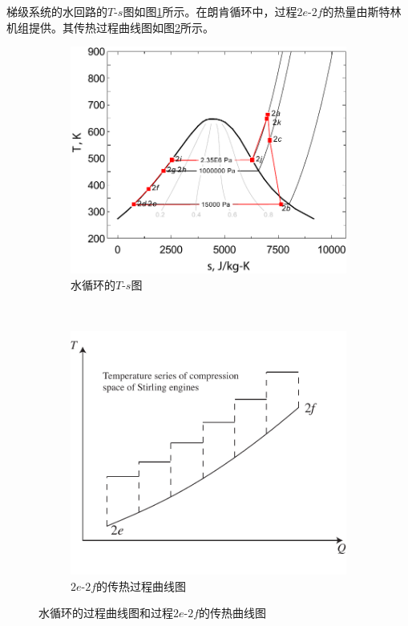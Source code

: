 梯级系统的水回路的$T$-$s$图如图\ref{fig:T-s_Water2}所示。在朗肯循环中，过程$2e$-$2f$的热量由斯特林机组提供。其传热过程曲线图如图\ref{fig:HeatTransfer_Water-SEs}所示。

\noindent \begin{figure}[htbp]
\centering
	\begin{subfigure}[b]{0.45\columnwidth}
	\includegraphics[width = \columnwidth]{fig/T-s_Water2}
	\caption{水循环的$T$-$s$图}\label{fig:T-s_Water2}
	\end{subfigure}
	~
\begin{subfigure}[b]{0.45\columnwidth}
	\includegraphics[width = \columnwidth]{fig/HeatTransfer_Water-SEs}
	\caption{$2e$-$2f$的传热过程曲线图}
	\label{fig:HeatTransfer_Water-SEs}
	\end{subfigure}
	
	\caption{水循环的过程曲线图和过程$2e$-$2f$的传热曲线图}\label{fig:Diagrams$2e$-$2f$}
\end{figure}


